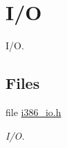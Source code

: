 \hypertarget{group__i386__io}{}\section{I/O}
\label{group__i386__io}


I/O.  


\subsection*{Files}
\begin{DoxyCompactItemize}
\item 
file \mbox{\hyperlink{i386__io_8h}{i386\+\_\+io.\+h}}
\begin{DoxyCompactList}\small\item\em I/O. \end{DoxyCompactList}\end{DoxyCompactItemize}
